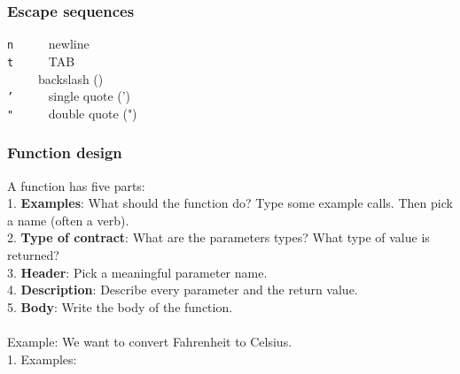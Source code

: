 \documentclass{article}
\begin{document}
{{{\subsubsection{Escape sequences}

\setminus\texttt{n} ~ ~ ~  newline\\
\setminus\texttt{t} ~ ~ ~  TAB\\
\setminus \setminus ~ ~ ~  backslash (\setminus)\\
\setminus\texttt{'} ~ ~ ~  single quote (')\\
\setminus\texttt{"} ~ ~ ~  double quote (")

\subsubsection{Function design}
A function has five parts:\\
1. \textbf{Examples}: What should the function do? Type some example calls. Then pick a name (often a verb).\\
2. \textbf{Type of contract}: What are the parameters types? What type of value is returned?\\
3. \textbf{Header}: Pick a meaningful parameter name.\\
4. \textbf{Description}: Describe every parameter and the return value.\\
5. \textbf{Body}: Write the body of the function.\\ 
\\
Example: We want to convert Fahrenheit to Celsius.\\
1. Examples:\\

}}}
\end{document}
